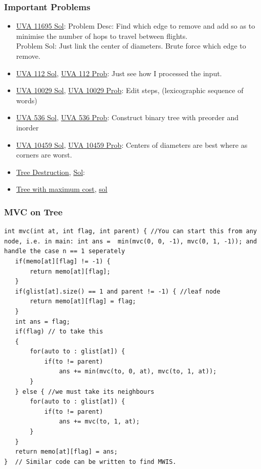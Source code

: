 \documentclass[8pt, a4paper, oneside, twocolumn]{extarticle}
\begin{document}
\subsubsection{Important Problems}
\begin{itemize}
	\item \href {https://gist.github.com/sourabh2311/6cff69fef833097556696bd6f31f3f1d}{UVA 11695 Sol}: Problem Desc: Find which edge to remove and add so as to minimise the number of hops to travel between flights.\\
	Problem Sol: Just link the center of diameters. Brute force which edge to remove. 
	\item \href {https://github.com/sourabh2311/Competitive-Programming/blob/master/UVA_112.cpp}{UVA 112 Sol}, \href {https://uva.onlinejudge.org/external/1/112.pdf}{UVA 112 Prob}: Just see how I processed the input.	
	\item \href {https://gist.github.com/sourabh2311/6b761c14bef4e5887e6b03b809bc4983}{UVA 10029 Sol}, \href {https://uva.onlinejudge.org/external/100/10029.pdf}{UVA 10029 Prob}: Edit steps, (lexicographic sequence of words)	
	\item \href {https://gist.github.com/sourabh2311/d73572fab5cf6d390f509d29abf4cd60}{UVA 536 Sol}, \href {https://uva.onlinejudge.org/external/5/536.pdf}{UVA 536 Prob}: Construct binary tree with preorder and inorder	
	\item \href {https://gist.github.com/sourabh2311/25edb7a7067948832ade9192bd2635ce}{UVA 10459 Sol}, \href {https://uva.onlinejudge.org/external/104/10459.pdf}{UVA 10459 Prob}: Centers of diameters are best where as corners are worst.	
    \item \href{https://codeforces.com/contest/911/problem/F}{Tree Destruction}, \href{https://codeforces.com/contest/911/submission/34122817}{Sol}:
    \item \href{https://codeforces.com/contest/1092/problem/F}{Tree with maximum cost}, \href{https://github.com/sourabh2311/Competitive-Programming/blob/master/CF/527%20Div3/F.cpp}{sol}
\end{itemize}
\subsubsection{MVC on Tree}
\begin{verbatim}
int mvc(int at, int flag, int parent) { //You can start this from any node, i.e. in main: int ans =  min(mvc(0, 0, -1), mvc(0, 1, -1)); and handle the case n == 1 seperately
   if(memo[at][flag] != -1) {
       return memo[at][flag];
   }
   if(glist[at].size() == 1 and parent != -1) { //leaf node
       return memo[at][flag] = flag;
   }
   int ans = flag;
   if(flag) // to take this
   {
       for(auto to : glist[at]) {
           if(to != parent)
               ans += min(mvc(to, 0, at), mvc(to, 1, at));
       }
   } else { //we must take its neighbours
       for(auto to : glist[at]) {
           if(to != parent)
               ans += mvc(to, 1, at);
       }
   }
   return memo[at][flag] = ans;
}  // Similar code can be written to find MWIS.
\end{verbatim}
\end{document}
